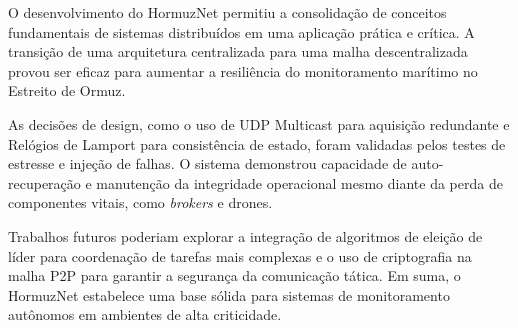 O desenvolvimento do HormuzNet permitiu a consolidação de conceitos fundamentais de sistemas distribuídos em uma aplicação prática e crítica. A transição de uma arquitetura centralizada para uma malha descentralizada provou ser eficaz para aumentar a resiliência do monitoramento marítimo no Estreito de Ormuz.

As decisões de design, como o uso de UDP Multicast para aquisição redundante e Relógios de Lamport para consistência de estado, foram validadas pelos testes de estresse e injeção de falhas. O sistema demonstrou capacidade de auto-recuperação e manutenção da integridade operacional mesmo diante da perda de componentes vitais, como \textit{brokers} e drones.

Trabalhos futuros poderiam explorar a integração de algoritmos de eleição de líder para coordenação de tarefas mais complexas e o uso de criptografia na malha P2P para garantir a segurança da comunicação tática. Em suma, o HormuzNet estabelece uma base sólida para sistemas de monitoramento autônomos em ambientes de alta criticidade.

